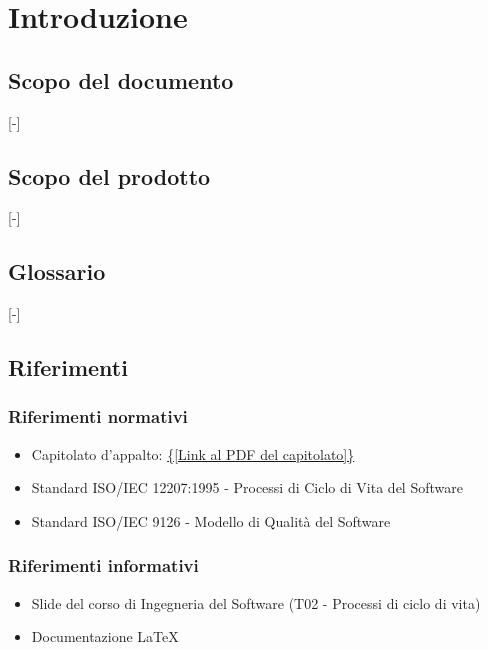 \section{Introduzione}

\subsection{Scopo del documento}
[-]

\subsection{Scopo del prodotto}
[-]

\subsection{Glossario}
[-]

\subsection{Riferimenti}
\subsubsection{Riferimenti normativi}
\begin{itemize}
	\item Capitolato d'appalto: \url{{[Link al PDF del capitolato]}}
	\item Standard ISO/IEC 12207:1995 - Processi di Ciclo di Vita del Software
	\item Standard ISO/IEC 9126 - Modello di Qualità del Software
\end{itemize}

\subsubsection{Riferimenti informativi}
\begin{itemize}
	\item Slide del corso di Ingegneria del Software (T02 - Processi di ciclo di vita)
	\item Documentazione LaTeX
\end{itemize}